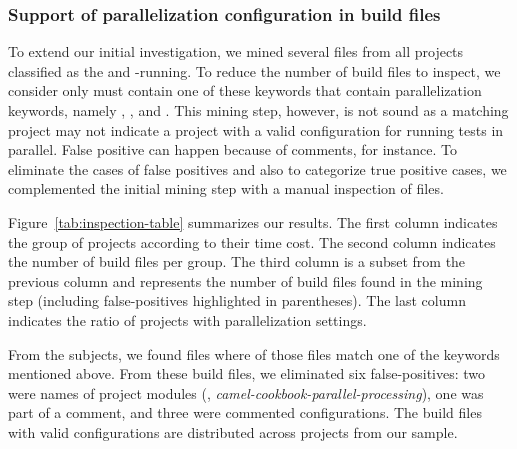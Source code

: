 
\subsubsection{Support of parallelization configuration in build files}
\label{sec:rqC-2}

To extend our initial investigation, we mined several \pomf{} files
from all \numMedLong{} projects classified as the \medg{} and
\longg{}-running.
To reduce the number of build files
to inspect, we consider only must contain one of these keywords that
contain parallelization keywords, namely ,
, and .  This mining step, however,
is not sound as a matching project may not indicate a project with a
valid configuration for running tests in parallel.  False positive can
happen because of comments, for instance.  To eliminate the cases of
false positives and also to categorize true positive cases, we
complemented the initial mining step with a manual inspection of
files.


Figure~\ref{tab:inspection-table} summarizes our results. The first
column indicates the group of projects according to their time cost.
The second column indicates the number of build files per group.  The
third column is a subset from the previous column and represents the
number of build files found in the mining step (including
false-positives highlighted in parentheses). The last column indicates
the ratio of projects with parallelization settings.

From the \numMedLong{} subjects, we found \pomMedLong{} \pomf{} files
where \numPomMatched{} of those files match one of the keywords
mentioned above.  From these \numPomMatched{} build files, we
eliminated six false-positives: two were names of project modules
(\eg, \emph{camel-cookbook-parallel-processing}), one was part of a
comment, and three were commented configurations. The
\numPomMatchedValid{} build files with valid configurations are
distributed across \numProjectsPar{} projects from our sample.
% 


